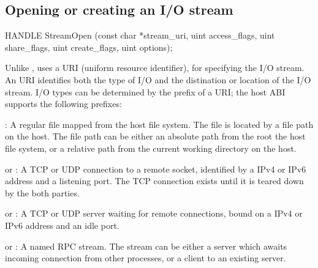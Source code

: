 \subsection*{Opening or creating an I/O stream}




\begin{paldef}
HANDLE StreamOpen (const char *stream_uri,
                   uint access_flags, uint share_flags,
                   uint create_flags, uint options);
\end{paldef}



Unlike ,  uses a URI (uniform resource identifier), for specifying the I/O stream.
An URI identifies both the type of I/O and the distination or location of the I/O stream.
I/O types can be determined by the prefix of a URI;
the host ABI supports the following prefixes:


\begin{compactitem}

\item {}: A regular file mapped from the host file system. The file is located by a file path on the host. The file path can be either an absolute path from the root the host file system, or a relative path from the current working directory on the host.

\item {} or : A TCP or UDP connection to a remote socket, identified by a IPv4 or IPv6 address and a listening port. The TCP connection exists until it is teared down by the both parties.

\item {} or : A TCP or UDP server waiting for remote connections, bound on a IPv4 or IPv6 address and an idle port.

\item {} or : A named RPC stream.
The stream can be either a server which awaits incoming connection from other processes,
or a client to an existing server.

\end{compactitem}



